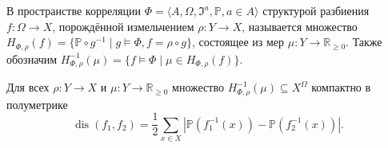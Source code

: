 \begin{definition}
	В пространстве корреляции $\Phi = \langle A, \Omega, \mathfrak{I}^a, \mathbb{P}, a \in A \rangle$ структурой разбиения $f : \Omega \rightarrow X$, порождённой измельчением $\rho : Y \rightarrow X$, называется множество $H_{\Phi,\rho}(f) = \{\mathbb{P} \circ g^{-1} \mid g \models \Phi, f = \rho \circ g\}$, состоящее из мер $\mu : Y \rightarrow \mathbb{R}_{\ge 0}$. Также обозначим $H_{\Phi,\rho}^{-1}(\mu) = \{f \models \Phi \mid \mu \in H_{\Phi,\rho}(f)\}$.
\end{definition}

\begin{lemma} \label{lemma:tyhon}
	Для всех $\rho : Y \rightarrow X$ и $\mu : Y \rightarrow \mathbb{R}_{\ge 0}$ множество $H_{\Phi,\rho}^{-1}(\mu) \subseteq X^{\Omega}$ компактно в полуметрике
	\begin{equation*}
		\operatorname{dis}(f_1, f_2) = \frac{1}{2} \sum_{x \in X} \left| \mathbb{P}(f_1^{-1}(x)) - \mathbb{P}(f_2^{-1}(x)) \right|.
	\end{equation*}
\end{lemma}

